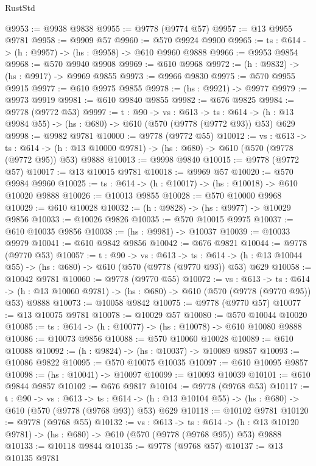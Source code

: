 \begin{lexlean}{RustStd}
\begin{coremodule}
@9953 := @9938 @9838
@9955 := @9778 (@9774 @57)
@9957 := @13 @9955 @9781
@9958 := @9909 @57
@9960 := @570 @9924 @9900
@9965 := {ts : @614} -> (h : @9957) -> (hs : @9958) -> @610 @9960 @9888
@9966 := @9953 @9854
@9968 := @570 @9940 @9908
@9969 := @610 @9968
@9972 := (h : @9832) -> (hs : @9917) -> @9969 @9855
@9973 := @9966 @9830
@9975 := @570 @9955 @9915
@9977 := @610 @9975 @9855
@9978 := (hs : @9921) -> @9977
@9979 := @9973 @9919
@9981 := @610 @9840 @9855
@9982 := @676 @9825
@9984 := @9778 (@9772 @53)
@9997 := {t : @90} ->
  {vs : @613} ->
  {ts : @614} -> (h : @13 @9984 @55) -> (hs : @680) -> @610 (@570 (@9778 (@9772 @93)) @53) @629
@9998 := @9982 @9781
@10000 := @9778 (@9772 @55)
@10012 := {vs : @613} ->
  {ts : @614} -> (h : @13 @10000 @9781) -> (hs : @680) -> @610 (@570 (@9778 (@9772 @95)) @53) @9888
@10013 := @9998 @9840
@10015 := @9778 (@9772 @57)
@10017 := @13 @10015 @9781
@10018 := @9969 @57
@10020 := @570 @9984 @9960
@10025 := {ts : @614} -> (h : @10017) -> (hs : @10018) -> @610 @10020 @9888
@10026 := @10013 @9855
@10028 := @570 @10000 @9968
@10029 := @610 @10028
@10032 := (h : @9828) -> (hs : @9977) -> @10029 @9856
@10033 := @10026 @9826
@10035 := @570 @10015 @9975
@10037 := @610 @10035 @9856
@10038 := (hs : @9981) -> @10037
@10039 := @10033 @9979
@10041 := @610 @9842 @9856
@10042 := @676 @9821
@10044 := @9778 (@9770 @53)
@10057 := {t : @90} ->
  {vs : @613} ->
  {ts : @614} -> (h : @13 @10044 @55) -> (hs : @680) -> @610 (@570 (@9778 (@9770 @93)) @53) @629
@10058 := @10042 @9781
@10060 := @9778 (@9770 @55)
@10072 := {vs : @613} ->
  {ts : @614} -> (h : @13 @10060 @9781) -> (hs : @680) -> @610 (@570 (@9778 (@9770 @95)) @53) @9888
@10073 := @10058 @9842
@10075 := @9778 (@9770 @57)
@10077 := @13 @10075 @9781
@10078 := @10029 @57
@10080 := @570 @10044 @10020
@10085 := {ts : @614} -> (h : @10077) -> (hs : @10078) -> @610 @10080 @9888
@10086 := @10073 @9856
@10088 := @570 @10060 @10028
@10089 := @610 @10088
@10092 := (h : @9824) -> (hs : @10037) -> @10089 @9857
@10093 := @10086 @9822
@10095 := @570 @10075 @10035
@10097 := @610 @10095 @9857
@10098 := (hs : @10041) -> @10097
@10099 := @10093 @10039
@10101 := @610 @9844 @9857
@10102 := @676 @9817
@10104 := @9778 (@9768 @53)
@10117 := {t : @90} ->
  {vs : @613} ->
  {ts : @614} -> (h : @13 @10104 @55) -> (hs : @680) -> @610 (@570 (@9778 (@9768 @93)) @53) @629
@10118 := @10102 @9781
@10120 := @9778 (@9768 @55)
@10132 := {vs : @613} ->
  {ts : @614} -> (h : @13 @10120 @9781) -> (hs : @680) -> @610 (@570 (@9778 (@9768 @95)) @53) @9888
@10133 := @10118 @9844
@10135 := @9778 (@9768 @57)
@10137 := @13 @10135 @9781

\end{coremodule}
\end{lexlean}
